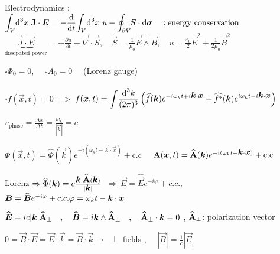 \item Electrodynamics : $\displaystyle{\int_{V}} \ud ^3x \,\, \vec{\rm{J}}\cdot\vec{E} = - \frac{\ud }{\ud t} \displaystyle{\int_{V}} \ud ^3x \,\, u - \displaystyle{\oint_{\partial V}} \! \vec{S}\cdot\vec{\ud \sigma} \quad : \text{energy conservation}$
\\
$\underbrace{\vec{J}\cdot\vec{E}}_{\text{dissipated power}} = -\frac{\partial u}{\partial t} - \vec{\nabla}\cdot\vec{S}, \quad \vec{S} = \frac{1}{\mu_0} \vec{E}\wedge\vec{B} , \quad u=\frac{\varepsilon_0}{2} \vec{E}^2 + \frac{1}{2\mu_0} \vec{B}^2$
\squishend

$\square \Phi_0 = 0$, $\quad \square A_0 = 0 \quad$ (Lorenz gauge)
\\
\\
$\square f(\vec{x},t) = 0 \, $ => $\, f(\vec{x},t) = \displaystyle{\int} \frac{\ud ^3k}{(2\pi)^3} \left(\widehat{f}(\vec{k})e^{-i\omega_kt + i\vec{k}\cdot\vec{x}} + \widehat{f^*}(\vec{k})e^{i\omega_k t - i \vec{k}\cdot\vec{x}} \right)$
\\
\squishlist
\item $v_{\text{phase}} = \frac{\Delta x}{\Delta t} = \frac{w_k}{|\vec{k}|} = c$

\item $\Phi(\vec{x},t) = \widehat{\Phi}(\vec{k}) e^{-i(\omega_k t- \vec{k}\cdot\vec{x})} + \text{c.c}$ $ \quad \vec{\rm{A}}(\vec{x},t) = \widehat{\vec{\rm{A}}}(\vec{k}) e^{-i(\omega_k t-\vec{k}\cdot\vec{x})} + \text{c.c}$ 

\item Lorenz $ \Rightarrow \widehat{\Phi}(\vec{k}) = c\frac{\vec{k}\cdot\widehat{\vec{\rm{A}}}(\vec{k})}{|\vec{k}|} \,$ $\Rightarrow \, \vec{E} = \widehat{\vec{E}} e^{-i\varphi}+c.c., $ $\vec{B} = \widehat{\vec{B}} e^{-i\varphi}+c.c.\newline \varphi = \omega_k t - \vec{k}\cdot\vec{x}$

\item $\widehat{\vec{E}} = i c |\vec{k}| \widehat{\vec{\rm{A}}}_{\perp} \quad, \quad \widehat{\vec{B}} = i \vec{k} \wedge \widehat{\vec{\rm{A}}}_{\perp} \quad, \quad \widehat{\vec{\rm{A}}}_{\perp} \cdot \vec{k}=0$ , $\widehat{\vec{\rm{A}}}_{\perp}$: polarization vector

\item $0 = \vec{B}\cdot\vec{E} = \vec{E}\cdot\vec{k} = \vec{B}\cdot\vec{k} \rightarrow$ $\perp$ fields , $\quad |\vec{B}| = \frac{1}{c}|\vec{E}|$

